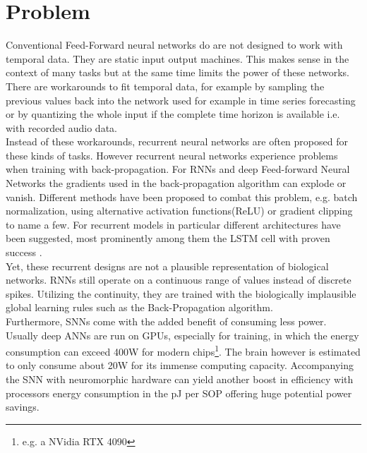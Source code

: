 \section{Problem}
Conventional Feed-Forward neural networks do are not designed to work with temporal data. They are static input output machines. This makes sense in the context of many tasks but at the same time limits the power of these networks. There are workarounds to fit temporal data, for example by sampling the previous values back into the network used for example in time series forecasting \cite{tang_feedforward_1993}\cite{yang_cascade_2022}\cite{uncini_audio_2003} or by quantizing the whole input if the complete time horizon is available i.e. with recorded audio data.\\
Instead of these workarounds, recurrent neural networks are often proposed for these kinds of tasks. However recurrent neural networks experience problems when training with back-propagation\cite{bengio_learning_1994}. For \acp{RNN} and deep Feed-forward Neural Networks the gradients used in the back-propagation algorithm can explode or vanish. Different methods have been proposed to combat this problem, e.g. batch normalization\cite{ioffe_batch_2015}, using alternative activation functions(ReLU)\cite{nair_rectified_2010} or gradient clipping\cite{pascanu_difficulty_2013} to name a few. For recurrent models in particular different architectures have been suggested, most prominently among them the LSTM cell \cite{hochreiter_long_1997} with proven success \cite{mayer_system_2006, sak_long_2014, li_constructing_2015}.\\
Yet, these recurrent designs are not a plausible representation of biological networks.
\acp{RNN} still operate on a continuous range of values instead of discrete spikes. Utilizing the continuity, they are trained with the biologically implausible global learning rules such as the Back-Propagation algorithm.\\
Furthermore, \acp{SNN} come with the added benefit of consuming less power. Usually deep \acp{ANN} are run on \acp{GPU}, especially for training, in which the energy consumption can exceed 400W for modern chips\footnote{e.g. a NVidia RTX 4090}. The brain however is estimated to only consume about
20W \cite{clarke_circulation_1999} for its immense computing capacity. Accompanying the \ac{SNN} with neuromorphic hardware can yield another boost in efficiency with processors energy consumption in the pJ per \ac{SOP}\cite{indiveri_importance_2019} offering huge potential power savings.



